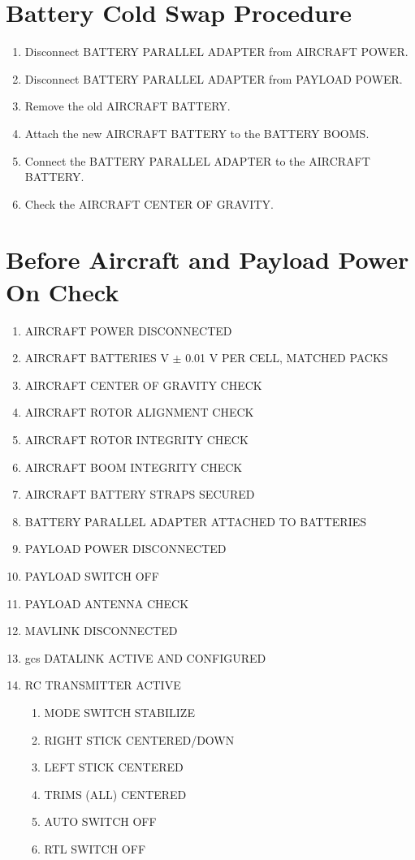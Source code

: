 \documentclass{report}
\begin{document}
	\section{Battery Cold Swap Procedure}
		\begin{enumerate}
			\item Disconnect BATTERY PARALLEL ADAPTER from AIRCRAFT POWER.
			\item Disconnect BATTERY PARALLEL ADAPTER from PAYLOAD POWER.
			\item Remove the old AIRCRAFT BATTERY.
			\item Attach the new AIRCRAFT BATTERY to the BATTERY BOOMS.
			\item Connect the BATTERY PARALLEL ADAPTER to the AIRCRAFT BATTERY.
			\item Check the AIRCRAFT CENTER OF GRAVITY.
		\end{enumerate}
	\section{Before Aircraft and Payload Power On Check}
		\begin{enumerate}
			\item AIRCRAFT POWER \hrulefill DISCONNECTED
			\item AIRCRAFT BATTERIES  V $\pm$ 0.01 V PER CELL, MATCHED PACKS
			\item AIRCRAFT CENTER OF GRAVITY \hrulefill CHECK
			\item AIRCRAFT ROTOR ALIGNMENT \hrulefill CHECK
			\item AIRCRAFT ROTOR INTEGRITY \hrulefill CHECK
			\item AIRCRAFT BOOM INTEGRITY \hrulefill CHECK
			\item AIRCRAFT BATTERY STRAPS \hrulefill SECURED
			\item BATTERY PARALLEL ADAPTER \hrulefill ATTACHED TO BATTERIES
			\item PAYLOAD POWER \hrulefill DISCONNECTED
			\item PAYLOAD SWITCH \hrulefill OFF
			\item PAYLOAD ANTENNA \hrulefill CHECK
			\item MAVLINK \hrulefill DISCONNECTED
			\item \gls{gcs} DATALINK \hrulefill ACTIVE AND CONFIGURED
			\item RC TRANSMITTER \hrulefill ACTIVE
			\begin{enumerate}
				\item MODE SWITCH \hrulefill STABILIZE
				\item RIGHT STICK \hrulefill CENTERED/DOWN
				\item LEFT STICK \hrulefill CENTERED
				\item TRIMS (ALL) \hrulefill CENTERED
				\item AUTO SWITCH \hrulefill OFF
				\item RTL SWITCH \hrulefill OFF
			\end{enumerate}
		\end{enumerate}
\end{document}
